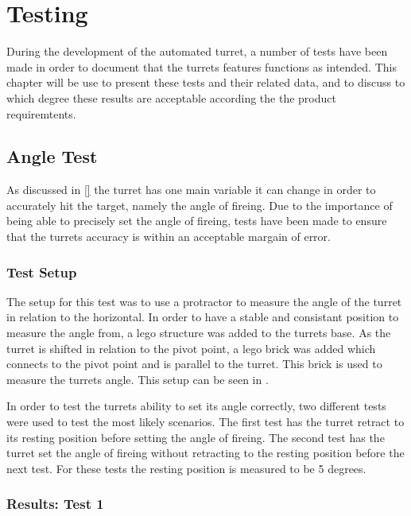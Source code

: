\chapter{Testing}
During the development of the automated turret, a number of tests have been made
in order to document that the turrets features functions as intended. This
chapter will be use to present these tests and their related data, and to
discuss to which degree these results are acceptable according the the product
requiremtents.

\section{Angle Test}
As discussed in \autoref{} the turret has one main variable it can change in
order to accurately hit the target, namely the angle of fireing. Due to the
importance of being able to precisely set the angle of fireing, tests have been
made to ensure that the turrets accuracy is within an acceptable margain of
error.

\subsection{Test Setup}
The setup for this test was to use a protractor to measure the angle of the
turret in relation to the horizontal. In order to have a stable and
consistant position to measure the angle from, a lego structure was added to the
turrets base. As the turret is shifted in relation to the pivot point, a lego
brick was added which connects to the pivot point and is parallel to the turret.
This brick is used to measure the turrets angle. This setup can be seen in
.

In order to test the turrets ability to set its angle correctly, two different
tests were used to test the most likely scenarios. The first test has the turret
retract to its resting position before setting the angle of fireing. The second
test has the turret set the angle of fireing without retracting to the resting
position before the next test. For these tests the resting position is measured
to be 5 degrees.

\subsection{Results: Test 1}



